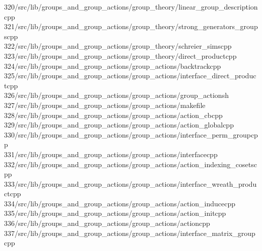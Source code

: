 \begin{tabbing}
320\>/src/lib/groups\_and\_group\_actions/group\_theory/linear\_group\_descriptioncpp\\[0pt]
321\>/src/lib/groups\_and\_group\_actions/group\_theory/strong\_generators\_groupscpp\\[0pt]
322\>/src/lib/groups\_and\_group\_actions/group\_theory/schreier\_simscpp\\[0pt]
323\>/src/lib/groups\_and\_group\_actions/group\_theory/direct\_productcpp\\[0pt]
324\>/src/lib/groups\_and\_group\_actions/group\_actions/backtrackcpp\\[0pt]
325\>/src/lib/groups\_and\_group\_actions/group\_actions/interface\_direct\_productcpp\\[0pt]
326\>/src/lib/groups\_and\_group\_actions/group\_actions/group\_actionsh\\[0pt]
327\>/src/lib/groups\_and\_group\_actions/group\_actions/makefile\\[0pt]
328\>/src/lib/groups\_and\_group\_actions/group\_actions/action\_cbcpp\\[0pt]
329\>/src/lib/groups\_and\_group\_actions/group\_actions/action\_globalcpp\\[0pt]
330\>/src/lib/groups\_and\_group\_actions/group\_actions/interface\_perm\_groupcpp\\[0pt]
331\>/src/lib/groups\_and\_group\_actions/group\_actions/interfacecpp\\[0pt]
332\>/src/lib/groups\_and\_group\_actions/group\_actions/action\_indexing\_cosetscpp\\[0pt]
333\>/src/lib/groups\_and\_group\_actions/group\_actions/interface\_wreath\_productcpp\\[0pt]
334\>/src/lib/groups\_and\_group\_actions/group\_actions/action\_inducecpp\\[0pt]
335\>/src/lib/groups\_and\_group\_actions/group\_actions/action\_initcpp\\[0pt]
336\>/src/lib/groups\_and\_group\_actions/group\_actions/actioncpp\\[0pt]
337\>/src/lib/groups\_and\_group\_actions/group\_actions/interface\_matrix\_groupcpp\\[0pt]

\end{tabbing}
